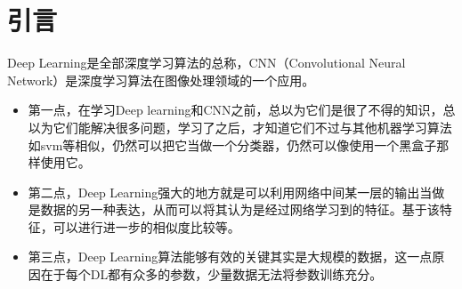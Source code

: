 \documentclass[a4paper,12pt]{ctexart}
\begin{document}
\begin{center}
\huge \textbf{}
\end{center}
\tableofcontents
\newpage
\chapter{引言}
Deep Learning是全部深度学习算法的总称，CNN（Convolutional Neural Network）是深度学习算法在图像处理领域的一个应用。
\begin{itemize}
	\item 第一点，在学习Deep learning和CNN之前，总以为它们是很了不得的知识，总以为它们能解决很多问题，学习了之后，才知道它们不过与其他机器学习算法如svm等相似，仍然可以把它当做一个分类器，仍然可以像使用一个黑盒子那样使用它。
	\item 第二点，Deep Learning强大的地方就是可以利用网络中间某一层的输出当做是数据的另一种表达，从而可以将其认为是经过网络学习到的特征。基于该特征，可以进行进一步的相似度比较等。
	\item 第三点，Deep Learning算法能够有效的关键其实是大规模的数据，这一点原因在于每个DL都有众多的参数，少量数据无法将参数训练充分。
\end{itemize}






%


%
%

%
\end{document}

